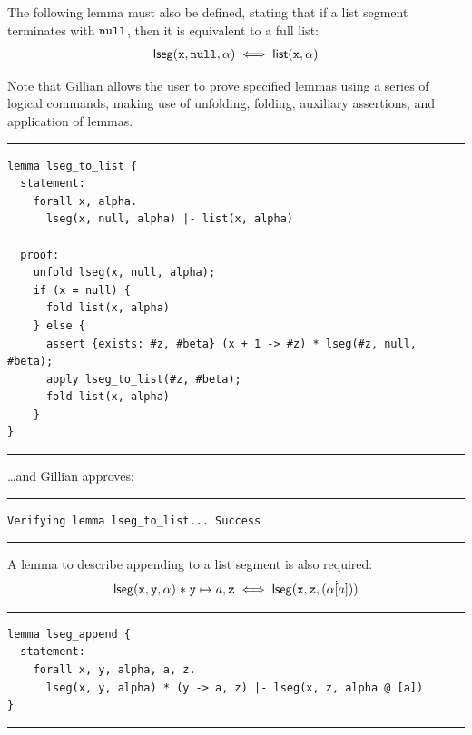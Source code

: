 The following lemma must also be defined, stating that if a list segment
terminates with $\mathtt{null}$, then it is equivalent to a full list:
\begin{align*}
  \mathsf{lseg}(\mathtt{x}, \mathtt{null}, \alpha) \iff \mathsf{list}(\mathtt{x}, \alpha)
\end{align*}

Note that Gillian allows the user to prove specified lemmas using a series of
logical commands, making use of unfolding, folding, auxiliary assertions, and
application of lemmas.

\noindent\rule{\textwidth}{0.5pt}
\vspace{-0.6cm}
\begin{verbatim}
lemma lseg_to_list {
  statement:
    forall x, alpha.
      lseg(x, null, alpha) |- list(x, alpha)

  proof:
    unfold lseg(x, null, alpha);
    if (x = null) {
      fold list(x, alpha)
    } else {
      assert {exists: #z, #beta} (x + 1 -> #z) * lseg(#z, null, #beta);
      apply lseg_to_list(#z, #beta);
      fold list(x, alpha)
    }
}
\end{verbatim}
\vspace{-0.4cm}
\noindent\rule{\textwidth}{0.5pt}
\vspace{-0.6cm}
\vspace{0.5cm}

\ldots and Gillian approves:

\noindent\rule{\textwidth}{0.5pt}
\vspace{-0.6cm}
\begin{verbatim}
Verifying lemma lseg_to_list... Success
\end{verbatim}
\vspace{-0.4cm}
\noindent\rule{\textwidth}{0.5pt}
\vspace{-0.6cm}
\vspace{0.5cm}

A lemma to describe appending to a list segment is also required:
\begin{align*}
    \mathsf{lseg}(\mathtt{x}, \mathtt{y}, \alpha) \mathrel{*} \mathtt{y} \mapsto a, \mathtt{z} \iff \mathsf{lseg}(\mathtt{x}, \mathtt{z}, (\alpha \dot [a]))
\end{align*}

\noindent\rule{\textwidth}{0.5pt}
\vspace{-0.6cm}
\begin{verbatim}
lemma lseg_append {
  statement:
    forall x, y, alpha, a, z.
      lseg(x, y, alpha) * (y -> a, z) |- lseg(x, z, alpha @ [a])
}
\end{verbatim}
\vspace{-0.4cm}
\noindent\rule{\textwidth}{0.5pt}
\vspace{-0.6cm}
\vspace{0.5cm}

